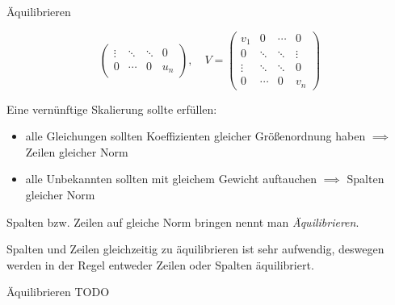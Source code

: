 \begin{bonus}{Äquilibrieren}
\begin{itemize}
\[\begin{pmatrix}
                      \vdots & \ddots & \ddots & 0      \\
                      0      & \cdots & 0      & u_n
                  \end{pmatrix},
                  \quad V =
                  \begin{pmatrix}
                      v_1    & 0      & \cdots & 0      \\
                      0      & \ddots & \ddots & \vdots \\
                      \vdots & \ddots & \ddots & 0      \\
                      0      & \cdots & 0      & v_n
                  \end{pmatrix}
              \]
    \end{itemize}
    
    Eine vernünftige Skalierung sollte erfüllen:
    \begin{itemize}
        \item alle Gleichungen sollten Koeffizienten gleicher Größenordnung haben $\implies$ Zeilen gleicher Norm
        \item alle Unbekannten sollten mit gleichem Gewicht auftauchen $\implies$ Spalten gleicher Norm
    \end{itemize}
    
    Spalten bzw. Zeilen auf gleiche Norm bringen nennt man \emph{Äquilibrieren}.
    
    Spalten und Zeilen gleichzeitig zu äquilibrieren ist sehr aufwendig, deswegen werden in der Regel entweder Zeilen oder Spalten äquilibriert.
\end{bonus}

\begin{example}{Äquilibrieren}
    TODO
\end{example}

